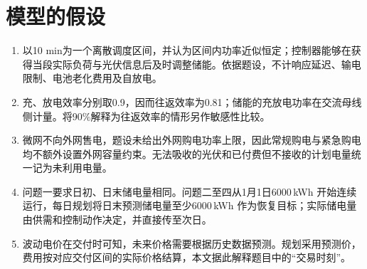 \section{模型的假设}
\begin{enumerate}
  \item 以10 min为一个离散调度区间，并认为区间内功率近似恒定；控制器能够在获得当段实际负荷与光伏信息后及时调整储能。依据题设，不计响应延迟、输电限制、电池老化费用及自放电。
  \item 充、放电效率分别取0.9，因而往返效率为0.81；储能的充放电功率在交流母线侧计量。将90\%解释为往返效率的情形另作敏感性比较。
  \item 微网不向外网售电，题设未给出外网购电功率上限，因此常规购电与紧急购电均不额外设置外网容量约束。无法吸收的光伏和已付费但不接收的计划电量统一记为未利用电量。
  \item 问题一要求日初、日末储电量相同。问题二至四从1月1日6000\,kWh 开始连续运行，每日规划将日末预测储电量至少6000\,kWh 作为恢复目标；实际储电量由供需和控制动作决定，并直接传至次日。
  \item 波动电价在交付时可知，未来价格需要根据历史数据预测。规划采用预测价，费用按对应交付区间的实际价格结算，本文据此解释题目中的“交易时刻”。

\end{enumerate}
